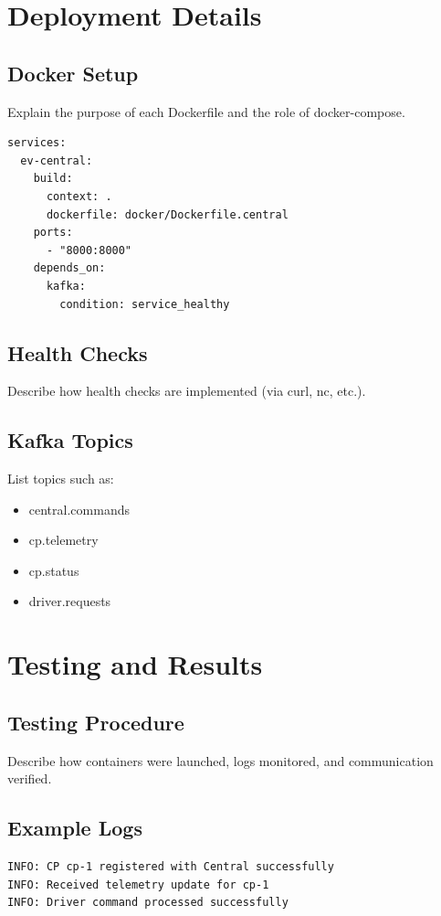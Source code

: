 \documentclass[12pt,a4paper]{article}
\begin{document}
\section{Deployment Details}

\subsection{Docker Setup}
Explain the purpose of each Dockerfile and the role of docker-compose.

\begin{lstlisting}[caption={Excerpt from docker-compose.yml}]
services:
  ev-central:
    build:
      context: .
      dockerfile: docker/Dockerfile.central
    ports:
      - "8000:8000"
    depends_on:
      kafka:
        condition: service_healthy
\end{lstlisting}

\subsection{Health Checks}
Describe how health checks are implemented (via curl, nc, etc.).

\subsection{Kafka Topics}
List topics such as:
\begin{itemize}
    \item central.commands
    \item cp.telemetry
    \item cp.status
    \item driver.requests
\end{itemize}

\section{Testing and Results}

\subsection{Testing Procedure}
Describe how containers were launched, logs monitored, and communication verified.

\subsection{Example Logs}
\begin{lstlisting}
INFO: CP cp-1 registered with Central successfully
INFO: Received telemetry update for cp-1
INFO: Driver command processed successfully
\end{lstlisting}
\end{document}
